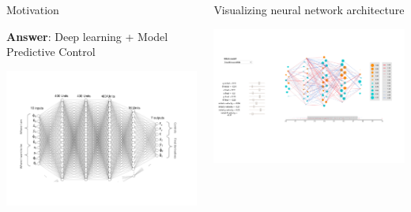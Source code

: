\documentclass[final,hyperref={pdfpagelabels=false}]{beamer}
\begin{document}
\begin{frame}{}
\begin{columns}[t]
\begin{column}{.33\linewidth}
\begin{block}{Motivation}
\begin{center}
\end{center}
\noindent   \textbf{ Answer}: Deep learning + Model Predictive Control 
\begin{center}
\includegraphics[scale=0.9]{s2.pdf}
\end{center}         
        
   \end{block}

    \vfill
   \end{column}

      \begin{column}{.65\linewidth}
      \begin{block}{Visualizing neural network architecture}
      \begin{center}
                \includegraphics[scale=1.2]{nn1.pdf}
      \end{center}
      \end{block}


\end{column}
\end{columns}
\end{frame}
\end{document}
